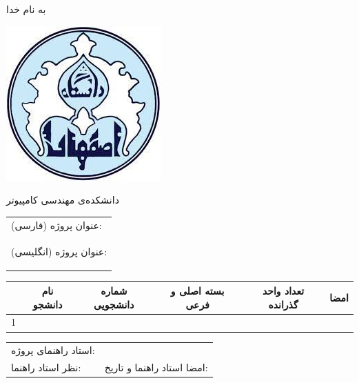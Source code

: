 \documentclass[dvipsnames, svgnames, x11names]{article}
\begin{document}
\begin{center}
{\small به نام خدا}

\vspace{5mm}
\includegraphics[scale=0.3]{images/logo}

{\small دانشکده‌ی مهندسی کامپیوتر}
\vspace{5mm}

\begin{adjustbox}{width=\textwidth}
\begin{tabular}{|p{\textwidth}|}
\hline
عنوان پروژه (فارسی):‌
\\
عنوان پروژه (انگلیسی):
\begin{latin}
\end{latin}
\\ \hline
\end{tabular}
\end{adjustbox}

\vspace{2mm}

\begin{adjustbox}{width=\textwidth}
\begin{tabular}{|c|c|c|c|c|p{2cm}|}
\cline{2-6}
\multicolumn{1}{c|}{} &

نام دانشجو & 
شماره‌ دانشجویی &
بسته اصلی و فرعی &
تعداد واحد گذرانده &
امضا \\
\hline
1 &
&
&
&
&
\\
\hline
\end{tabular}
\end{adjustbox}

\vspace{2mm}

\begin{adjustbox}{width=\textwidth}
\begin{tabular}{|p{}|p{}|}
\hline
استاد راهنمای پروژه: %
&
\\
\cline{1-1}
نظر استاد راهنما:  %
\vspace{4cm}
& 
\vspace{3.6cm}
امضا استاد راهنما و تاریخ: %
\\
\hline
\end{tabular}
\end{adjustbox}


\end{center}
\end{document}
